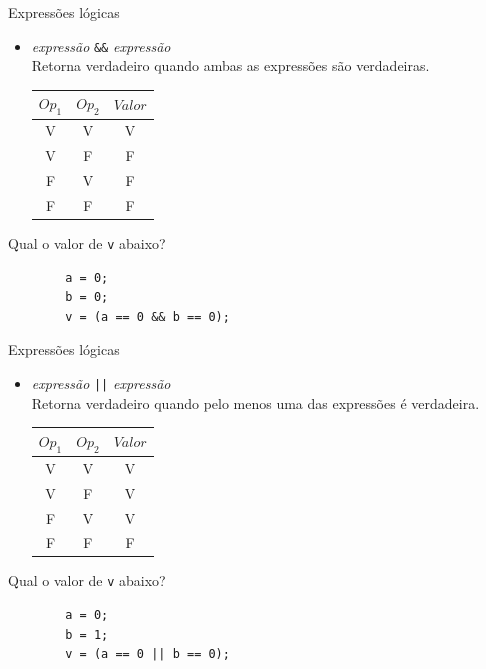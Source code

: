 \documentclass[handout]{beamer}
\newcommand{\cod}[1]{\texttt{#1}}
\begin{document}
\begin{frame}[fragile]{Expressões lógicas}

    \begin{itemize}
        \item {\it expressão} \cod{&&} {\it expressão} \\
        Retorna verdadeiro quando ambas as expressões são verdadeiras.

        \begin{center}
            \begin{tabular}{|c|c||c|}
                \hline
                $Op_1$ & $Op_2$ & $Valor$ \\ \hline
                V & V & V \\
                V & F & F \\
                F & V & F \\
                F & F & F \\
                \hline
            \end{tabular}
        \end{center}
    \end{itemize}

    Qual o valor de \cod{v} abaixo?
    \begin{verbatim}
        a = 0;
        b = 0;
        v = (a == 0 && b == 0);
    \end{verbatim}
\end{frame}

\begin{frame}[fragile]{Expressões lógicas}

    \begin{itemize}
        \item {\it expressão} \cod{||} {\it expressão} \\
        Retorna verdadeiro quando pelo menos uma das expressões é verdadeira.

        \begin{center}
            \begin{tabular}{|c|c||c|}
                \hline
                $Op_1$ & $Op_2$ & $Valor$ \\ \hline
                V & V & V \\
                V & F & V \\
                F & V & V \\
                F & F & F \\
                \hline
            \end{tabular}
        \end{center}
    \end{itemize}

    Qual o valor de \cod{v} abaixo?
    \begin{verbatim}
        a = 0;
        b = 1;
        v = (a == 0 || b == 0);
    \end{verbatim}
\end{frame}
\end{document}
